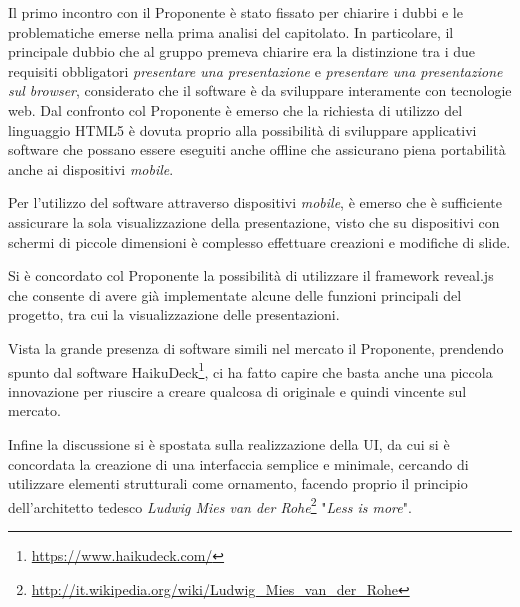 Il primo incontro con il Proponente è stato fissato per chiarire i dubbi e le problematiche emerse nella prima analisi del capitolato. In particolare, il principale dubbio che al gruppo premeva chiarire era la distinzione tra i due requisiti obbligatori \textit{presentare una presentazione} e \textit{presentare una presentazione sul \gls{browser}}, considerato che il software è da sviluppare interamente con tecnologie web. Dal confronto col Proponente è emerso che la richiesta di utilizzo del linguaggio \gls{HTML5} è dovuta proprio alla possibilità di sviluppare applicativi software che possano essere eseguiti anche offline che assicurano piena portabilità anche ai dispositivi \textit{mobile}. 

\noindent Per l'utilizzo del software \PROGETTO{} attraverso dispositivi \textit{mobile}, è emerso che è sufficiente assicurare la sola visualizzazione della presentazione, visto che su dispositivi con schermi di piccole dimensioni è complesso effettuare creazioni e modifiche di \gls{slide}.

\noindent Si è concordato col Proponente la possibilità di utilizzare il \gls{framework} \gls{reveal.js} che consente di avere già implementate alcune delle funzioni principali del progetto, tra cui la visualizzazione delle presentazioni.

\noindent Vista la grande presenza di software simili nel mercato il Proponente, prendendo spunto dal software HaikuDeck\footnote{\url{https://www.haikudeck.com/}}, ci ha fatto capire che basta anche una piccola innovazione per riuscire a creare qualcosa di originale e quindi vincente sul mercato. 

\noindent Infine la discussione si è spostata sulla realizzazione della \gls{UI}, da cui si è concordata la creazione di una interfaccia semplice e minimale, cercando di utilizzare elementi strutturali come ornamento, facendo proprio il principio dell'architetto tedesco \textit{Ludwig Mies van der Rohe}\footnote{\url{http://it.wikipedia.org/wiki/Ludwig_Mies_van_der_Rohe}} "\textit{Less is more}". 

